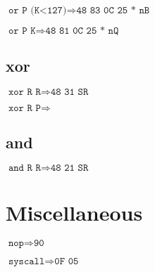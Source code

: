 \documentclass{article}
\begin{document}
$\texttt{or P (K<127)} \Rightarrow \texttt{48 83 0C 25 * nB}$

$\texttt{or P K} \Rightarrow \texttt{48 81 0C 25 * nQ}$


\subsection{xor}

$\texttt{xor R R} \Rightarrow \texttt{48 31 SR}$

$\texttt{xor R P} \Rightarrow \texttt{}$


\subsection{and}

$\texttt{and R R} \Rightarrow \texttt{48 21 SR}$


\section{Miscellaneous}

$\texttt{nop} \Rightarrow \texttt{90}$

$\texttt{syscall} \Rightarrow \texttt{0F 05}$
\end{document}
